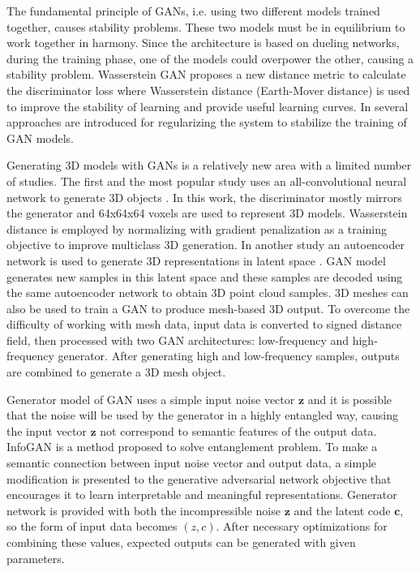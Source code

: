 \documentclass[runningheads]{llncs}
\begin{document}
The fundamental principle of GANs, i.e. using two different models trained together, causes stability problems. These two models must be in equilibrium to work together in harmony. Since the architecture is based on dueling networks, during the training phase, one of the models could overpower the other, causing a stability problem. Wasserstein GAN \cite{arjovsky2017wasserstein} proposes a new distance metric to calculate the discriminator loss where Wasserstein distance (Earth-Mover distance) is used to improve the stability of learning and provide useful learning curves. In \cite{che2016mode} several approaches are introduced for regularizing the system to stabilize the training of GAN models.

Generating 3D models with GANs is a relatively new area with a limited number of studies. The first and the most popular study uses an all-convolutional neural network to generate 3D objects \cite{wu2016learning}. In this work, the discriminator mostly mirrors the generator and 64x64x64 voxels are used to represent 3D models. Wasserstein distance \cite{smith2017improved} is employed by normalizing with gradient penalization as a training objective to improve multiclass 3D generation. In another study an autoencoder network is used to generate 3D representations in latent space \cite{achlioptas2017representation}. GAN model generates new samples in this latent space and these samples are decoded using the same autoencoder network to obtain 3D point cloud samples. 3D meshes can also be used to train a GAN \cite{jiang2017hierarchical} to produce mesh-based 3D output. To overcome the difficulty of working with mesh data, input data is converted to signed distance field, then processed with two GAN architectures: low-frequency and high-frequency generator. After generating high and low-frequency samples, outputs are combined to generate a 3D mesh object.

Generator model of GAN uses a simple input noise vector $\mathbf{z}$ and it is possible that the noise will be used by the generator in a highly entangled way, causing the input vector $\mathbf{z}$ not correspond to semantic features of the output data.  InfoGAN \cite{chen2016infogan} is a method proposed to solve entanglement problem. To make a semantic connection between input noise vector and output data, a simple modification is presented to the generative adversarial network objective that encourages it to learn interpretable and meaningful representations. Generator network is provided with both the incompressible noise $\mathbf{z}$ and the latent code $\mathbf{c}$, so the form of input data becomes $(z, c)$. After necessary optimizations for combining these values, expected outputs can be generated with given parameters.
\end{document}

